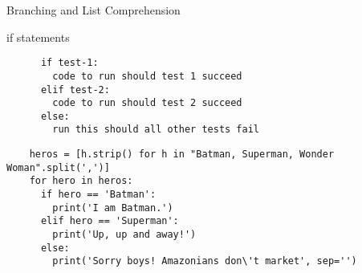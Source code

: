 \begin{frame}[fragile]{Branching and List Comprehension}
  \vspace{2pt}
  \begin{block}{if statements}
    \begin{verbatim}
      if test-1:
        code to run should test 1 succeed
      elif test-2:
        code to run should test 2 succeed
      else:
        run this should all other tests fail
    \end{verbatim}
  \end{block}

  \begin{verbatim}
    heros = [h.strip() for h in "Batman, Superman, Wonder Woman".split(',')]
    for hero in heros:
      if hero == 'Batman':
        print('I am Batman.')
      elif hero == 'Superman':
        print('Up, up and away!')
      else:
        print('Sorry boys! Amazonians don\'t market', sep='')
  \end{verbatim}
\end{frame}
